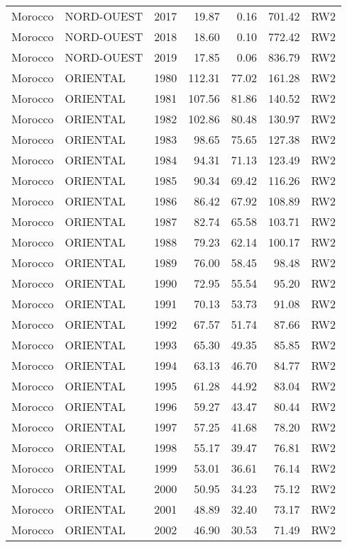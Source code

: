 \begin{longtable}{lllrrrl}
  Morocco & NORD-OUEST & 2017 & 19.87 & 0.16 & 701.42 & RW2 \\ 
  Morocco & NORD-OUEST & 2018 & 18.60 & 0.10 & 772.42 & RW2 \\ 
  Morocco & NORD-OUEST & 2019 & 17.85 & 0.06 & 836.79 & RW2 \\ 
  Morocco & ORIENTAL & 1980 & 112.31 & 77.02 & 161.28 & RW2 \\ 
  Morocco & ORIENTAL & 1981 & 107.56 & 81.86 & 140.52 & RW2 \\ 
  Morocco & ORIENTAL & 1982 & 102.86 & 80.48 & 130.97 & RW2 \\ 
  Morocco & ORIENTAL & 1983 & 98.65 & 75.65 & 127.38 & RW2 \\ 
  Morocco & ORIENTAL & 1984 & 94.31 & 71.13 & 123.49 & RW2 \\ 
  Morocco & ORIENTAL & 1985 & 90.34 & 69.42 & 116.26 & RW2 \\ 
  Morocco & ORIENTAL & 1986 & 86.42 & 67.92 & 108.89 & RW2 \\ 
  Morocco & ORIENTAL & 1987 & 82.74 & 65.58 & 103.71 & RW2 \\ 
  Morocco & ORIENTAL & 1988 & 79.23 & 62.14 & 100.17 & RW2 \\ 
  Morocco & ORIENTAL & 1989 & 76.00 & 58.45 & 98.48 & RW2 \\ 
  Morocco & ORIENTAL & 1990 & 72.95 & 55.54 & 95.20 & RW2 \\ 
  Morocco & ORIENTAL & 1991 & 70.13 & 53.73 & 91.08 & RW2 \\ 
  Morocco & ORIENTAL & 1992 & 67.57 & 51.74 & 87.66 & RW2 \\ 
  Morocco & ORIENTAL & 1993 & 65.30 & 49.35 & 85.85 & RW2 \\ 
  Morocco & ORIENTAL & 1994 & 63.13 & 46.70 & 84.77 & RW2 \\ 
  Morocco & ORIENTAL & 1995 & 61.28 & 44.92 & 83.04 & RW2 \\ 
  Morocco & ORIENTAL & 1996 & 59.27 & 43.47 & 80.44 & RW2 \\ 
  Morocco & ORIENTAL & 1997 & 57.25 & 41.68 & 78.20 & RW2 \\ 
  Morocco & ORIENTAL & 1998 & 55.17 & 39.47 & 76.81 & RW2 \\ 
  Morocco & ORIENTAL & 1999 & 53.01 & 36.61 & 76.14 & RW2 \\ 
  Morocco & ORIENTAL & 2000 & 50.95 & 34.23 & 75.12 & RW2 \\ 
  Morocco & ORIENTAL & 2001 & 48.89 & 32.40 & 73.17 & RW2 \\ 
  Morocco & ORIENTAL & 2002 & 46.90 & 30.53 & 71.49 & RW2 \\ 

\end{longtable}
